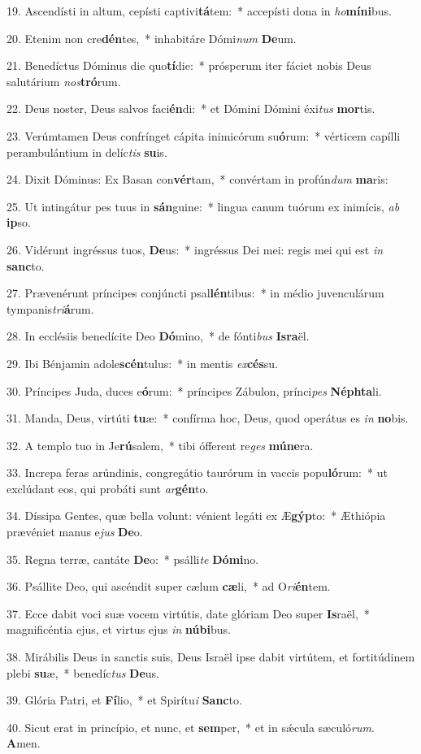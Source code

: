 19. Ascendísti in altum, cepísti captivi\textbf{tá}tem:~*  accepísti dona in \textit{ho}\textbf{mí}\textbf{ni}bus.\

20. Etenim non cre\textbf{dén}tes,~*  inhabitáre Dómi\textit{num} \textbf{De}um.\

21. Benedíctus Dóminus die quo\textbf{tí}die:~*  prósperum iter fáciet nobis Deus salutárium \textit{nos}\textbf{tró}rum.\

22. Deus noster, Deus salvos faci\textbf{én}di:~*  et Dómini Dómini éxi\textit{tus} \textbf{mor}tis.\

23. Verúmtamen Deus confrínget cápita inimicórum su\textbf{ó}rum:~*  vérticem capílli perambulántium in delíc\textit{tis} \textbf{su}is.\

24. Dixit Dóminus: Ex Basan con\textbf{vér}tam,~*  convértam in profún\textit{dum} \textbf{ma}ris:\

25. Ut intingátur pes tuus in \textbf{sán}guine:~*  lingua canum tuórum ex inimícis, \textit{ab} \textbf{ip}so.\

26. Vidérunt ingréssus tuos, \textbf{De}us:~*  ingréssus Dei mei: regis mei qui est \textit{in} \textbf{sanc}to.\

27. Prævenérunt príncipes conjúncti psal\textbf{lén}tibus:~*  in médio juvenculárum tympanis\textit{tri}\textbf{á}rum.\

28. In ecclésiis benedícite Deo \textbf{Dó}mino,~*  de fónti\textit{bus} \textbf{Is}\textbf{ra}ël.\

29. Ibi Bénjamin adole\textbf{scén}tulus:~*  in mentis \textit{ex}\textbf{cés}su.\

30. Príncipes Juda, duces e\textbf{ó}rum:~*  príncipes Zábulon, prínci\textit{pes} \textbf{Néph}\textbf{ta}li.\

31. Manda, Deus, virtúti \textbf{tu}æ:~*  confírma hoc, Deus, quod operátus es \textit{in} \textbf{no}bis.\

32. A templo tuo in Je\textbf{rú}salem,~*  tibi ófferent re\textit{ges} \textbf{mú}\textbf{ne}ra.\

33. Increpa feras arúndinis, congregátio taurórum in vaccis popu\textbf{ló}rum:~*  ut exclúdant eos, qui probáti sunt \textit{ar}\textbf{gén}to.\

34. Díssipa Gentes, quæ bella volunt: vénient legáti ex Æ\textbf{gýp}to:~*  Æthiópia prævéniet manus e\textit{jus} \textbf{De}o.\

35. Regna terræ, cantáte \textbf{De}o:~*  psálli\textit{te} \textbf{Dó}\textbf{mi}no.\

36. Psállite Deo, qui ascéndit super cælum \textbf{cæ}li,~*  ad O\textit{ri}\textbf{én}tem.\

37. Ecce dabit voci suæ vocem virtútis, date glóriam Deo super \textbf{Is}raël,~*  magnificéntia ejus, et virtus ejus \textit{in} \textbf{nú}\textbf{bi}bus.\

38. Mirábilis Deus in sanctis suis, Deus Israël ipse dabit virtútem, et fortitúdinem plebi \textbf{su}æ,~*  benedíc\textit{tus} \textbf{De}us.\

39. Glória Patri, et \textbf{Fí}lio,~*  et Spirítu\textit{i} \textbf{Sanc}to.\

40. Sicut erat in princípio, et nunc, et \textbf{sem}per,~*  et in sǽcula sæculó\textit{rum}. \textbf{A}men.\

